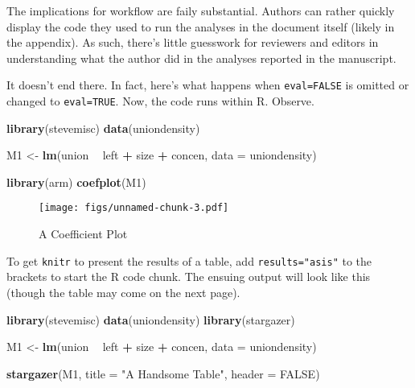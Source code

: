 \documentclass[10pt,a4paper]{article}
\newenvironment{Shaded}{\begin{snugshade}}{\end{snugshade}}
\newcommand{\DataTypeTok}[1]{\textcolor[rgb]{0.13,0.29,0.53}{#1}}
\newcommand{\KeywordTok}[1]{\textcolor[rgb]{0.13,0.29,0.53}{\textbf{#1}}}
\newcommand{\NormalTok}[1]{#1}
\newcommand{\OperatorTok}[1]{\textcolor[rgb]{0.81,0.36,0.00}{\textbf{#1}}}
\newcommand{\OtherTok}[1]{\textcolor[rgb]{0.56,0.35,0.01}{#1}}
\newcommand{\StringTok}[1]{\textcolor[rgb]{0.31,0.60,0.02}{#1}}
\begin{document}
The implications for workflow are faily substantial. Authors can rather
quickly display the code they used to run the analyses in the document
itself (likely in the appendix). As such, there's little guesswork for
reviewers and editors in understanding what the author did in the
analyses reported in the manuscript.

It doesn't end there. In fact, here's what happens when
\texttt{eval=FALSE} is omitted or changed to \texttt{eval=TRUE}. Now,
the code runs within R. Observe.

\begin{Shaded}
\begin{Highlighting}[]
\KeywordTok{library}\NormalTok{(stevemisc)}
\KeywordTok{data}\NormalTok{(uniondensity)}

\NormalTok{M1 <-}\StringTok{ }\KeywordTok{lm}\NormalTok{(union }\OperatorTok{~}\StringTok{ }\NormalTok{left }\OperatorTok{+}\StringTok{ }
\StringTok{    }\NormalTok{size }\OperatorTok{+}\StringTok{ }\NormalTok{concen, }\DataTypeTok{data =}\NormalTok{ uniondensity)}

\KeywordTok{library}\NormalTok{(arm)}
\KeywordTok{coefplot}\NormalTok{(M1)}
\end{Highlighting}
\end{Shaded}

\begin{figure}
\centering
\texttt{[image: figs/unnamed-chunk-3.pdf]}
\caption{A Coefficient Plot}
\end{figure}

To get \texttt{knitr} to present the results of a table, add
\texttt{results="asis"} to the brackets to start the R code chunk. The
ensuing output will look like this (though the table may come on the
next page).

\begin{Shaded}
\begin{Highlighting}[]
\KeywordTok{library}\NormalTok{(stevemisc)}
\KeywordTok{data}\NormalTok{(uniondensity)}
\KeywordTok{library}\NormalTok{(stargazer)}

\NormalTok{M1 <-}\StringTok{ }\KeywordTok{lm}\NormalTok{(union }\OperatorTok{~}\StringTok{ }\NormalTok{left }\OperatorTok{+}\StringTok{ }
\StringTok{    }\NormalTok{size }\OperatorTok{+}\StringTok{ }\NormalTok{concen, }\DataTypeTok{data =}\NormalTok{ uniondensity)}

\KeywordTok{stargazer}\NormalTok{(M1, }\DataTypeTok{title =} \StringTok{"A Handsome Table"}\NormalTok{, }
    \DataTypeTok{header =} \OtherTok{FALSE}\NormalTok{)}
\end{Highlighting}
\end{Shaded}
\end{document}
